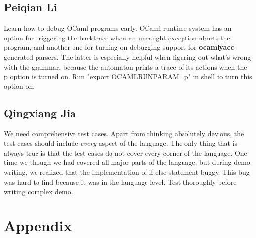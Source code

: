 \documentclass[a4paper,12pt]{article}
\begin{document}
\subsection{Peiqian Li}
Learn how to debug OCaml programs early. OCaml runtime system has an option for triggering the backtrace when an uncaught exception aborts the program, and another one for turning on debugging support for \textbf{ocamlyacc}-generated parsers. The latter is especially helpful when figuring out what's wrong with the grammar, because the automaton prints a trace of its actions when the p option is turned on. Run "export OCAMLRUNPARAM=p" in shell to turn this option on.

\subsection{Qingxiang Jia}
We need comprehensive test cases. Apart from thinking absolutely devious, the test cases should include \textit{every} aspect of the language. The only thing that is always true is that the test cases do not cover every corner of the language. One time we though we had covered all major parts of the language, but during demo writing, we realized that the implementation of if-else statement buggy. This bug was hard to find because it was in the language level. Test thoroughly before writing complex demo.

\section{Appendix}
\end{document}
